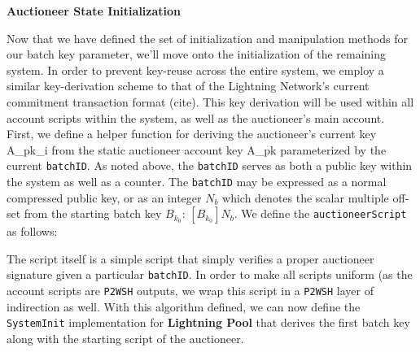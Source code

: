 \documentclass[10pt,a4paper]{article}
\theoremstyle{definition}
\begin{document}
\begin{center}
    \textbf{Auctioneer State Initialization}
\end{center}

Now that we have defined the set of initialization and manipulation methods for
our batch key parameter, we'll move onto the initialization of the remaining
system. In order to prevent key-reuse across the entire system, we employ a
similar key-derivation scheme to that of the Lightning Network's current
commitment transaction format (cite). This key derivation will be used within
all account scripts within the system, as well as the auctioneer's main
account. \\

First, we define a helper function for deriving the auctioneer's current key
A_{pk_i} from the static auctioneer account key A_{pk} parameterized by the
current \texttt{batchID}. As noted above, the \texttt{batchID} serves as both a
public key within the system as well as a counter. The \texttt{batchID} may be
expressed as a normal compressed public key, or as an integer $N_{b}$ which
denotes the scalar multiple off-set from the starting batch key
$B_{k_0}$: $[B_{k_0}]N_{b}$. We define the \texttt{auctioneerScript} as follows: 

\begin{pcvstack}[boxed,center, space=1em]
\end{pcvstack} 

The script itself is a simple script that simply verifies a proper auctioneer
signature given a particular \texttt{batchID}. In order to make all scripts
uniform (as the account scripts are \texttt{P2WSH} outputs, we wrap this script
in a \texttt{P2WSH} layer of indirection as well. With this algorithm defined,
we can now define the \texttt{SystemInit} implementation for \textbf{Lightning
Pool} that derives the first batch key along with the starting script of the
auctioneer. \\

\begin{pcvstack}[boxed,center, space=1em]
\end{pcvstack} 
\end{document}
